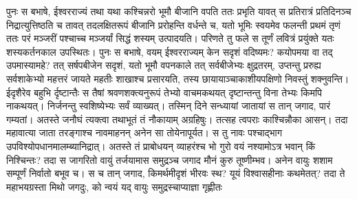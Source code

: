 \vakya पुनः स बभाषे, ईश्वरराज्यं तथा यथा कश्चिन्नरो भूमौ बीजानि वपति
\vakya ततः प्रभृति यावत् स प्रतिरात्रं प्रतिदिनञ्च निद्रात्युत्तिष्ठति च तावत् तदलक्षितरूपं बीजानि प्ररोहन्ति वर्धन्ते च,
\vakya यतो भूमिः स्वयमेव फलन्ती प्रथमं तृणं ततः परं मञ्जरीं पश्चाच्च मञ्जर्यां सिद्धं शस्यम् उत्पादयति।
\vakya परिणते तु फले स तूर्णं लवित्रं प्रयुंक्ते यतः शस्यकर्तनकाल उपस्थितः।
\vakya पुनः स बभाषे, वयम् ईश्वरराज्यम् केन सदृशं वदिष्यमः? कयोपमया वा तद् उपमास्यामहे?
\vakya तत् सर्षपबीजेन सदृशं, यतो भूमौ वपनकाले तत् सर्वबीजेभ्यः क्षुद्रतरम्,
\vakya उप्तन्तु प्ररुह्य सर्वशाकेभ्यो महत्तरं जायते महतीः शाखाश्च प्रसारयति, तस्य छायायाञ्चाकाशीयपक्षिणो निवस्तुं शक्नुवन्ति।
\vakya ईदृशैरेव बहुभि र्दृष्टान्तैः स तैषां श्रवणशक्त्यनुरूपं तेभ्यो वाचमकथयत् दृष्टान्तन्तु विना तेभ्यः किमपि नाकथयत्।
\vakya निर्जनन्तु स्वशिष्येभ्यः सर्वं व्याख्यत्।
\vakya तस्मिन् दिने सन्ध्यायां जातायां स तान् जगाद, पारं गम्यतां।
\vakya अतस्ते जनौघं त्यक्त्वा तथाभूतं तं नौकायाम् अग्रहिषुः। तत्सह त्वपराः काश्चिन्नौका आसन्।
\vakya तदा महावात्या जाता तरङ्गाश्च नावमाहनन् अनेन सा तोयेनापूर्यत।
\vakya स तु नावः पश्चाद्भाग उपविश्योपधानमालम्ब्यानिद्रात्। अतस्ते तं प्राबोधयन् व्याहरंश्च भो गुरो वयं नश्यामोऽत्र भवान् किं निश्चिन्तः?
\vakya तदा स जागरितो वायुं तर्जयामास समुद्रञ्च जगाद मौनं कुरु तूष्णीम्भव। अनेन वायुः शशाम सम्पूर्णं निर्वातो बभूव च।
\vakya स च तान् जगाद, किमर्थमीदृशं भीरवः स्थ? यूयं विश्वासहीनाः कथमेतत्?
\vakya तदा ते महाभयग्रस्ता मिथो जगदुः, को न्वयं यद् वायुः समुद्रस्चाप्याज्ञा गृह्णीतः\eoc